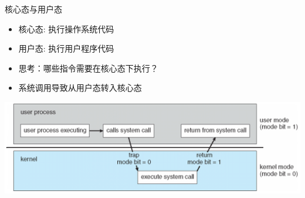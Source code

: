 \documentclass[xcolor=svgnames]{beamer}
\begin{document}
\begin{CJK*}{UTF8}{gbsn}
\begin{frame}{核心态与用户态}
\begin{itemize}
\item 核心态: 执行操作系统代码
\item 用户态: 执行用户程序代码
\item 思考：哪些指令需要在核心态下执行？
\item 系统调用导致从用户态转入核心态
\end{itemize}
\includegraphics[width=1.0\textwidth]{mode.png}
\end{frame}


\end{CJK*}
\end{document}

